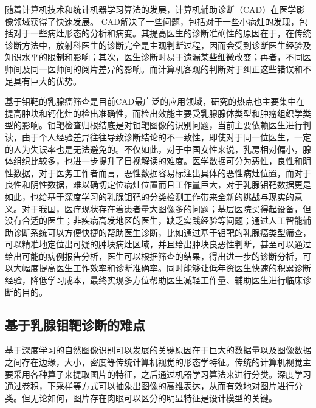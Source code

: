 随着计算机技术和统计机器学习算法的发展，计算机辅助诊断（CAD）\cite{3sathish2016medical}在医学影像领域获得了快速发展。
CAD解决了一些问题，包括对于一些小病灶的发现，包括对于一些病灶形态的分析和病变。其提高医生的诊断准确性的原因在于，在传统诊断方法中，放射科医生的诊断完全是主观判断过程，因而会受到诊断医生经验及知识水平的限制和影响；其次，医生诊断时易于遗漏某些细微改变；再者，不同医师间及同一医师间的阅片差异的影响。而计算机客观的判断对于纠正这些错误和不足具有巨大的优势。

基于钼靶的乳腺癌筛查是目前CAD最广泛的应用领域，研究的热点也主要集中在提高肿块和钙化灶的检出准确性，而检出效能主要受乳腺腺体类型和肿瘤组织学类型的影响。钼靶检查归根结底是对钼靶图像的识别问题，当前主要依赖医生进行判读，由于个人经验差异往往导致诊断结论的不一致性，即使对于同一位医生，一定的人为失误率也是无法避免的。不仅如此，对于中国女性来说，乳房相对偏小，腺体组织比较多，也进一步提升了目视解读的难度。医学数据可分为恶性，良性和阴性数据，对于医务工作者而言，恶性数据容易标注出具体的恶性病灶位置，而对于良性和阴性数据，难以确切定位病灶位置而且工作量巨大，对于乳腺钼靶数据更是如此，也给基于深度学习的乳腺钼靶的分类检测工作带来全新的挑战与现实的意义。对于我国，医疗现状存在着患者量大图像多的问题；基层医院买得起设备，但没有合适的医生；非疾病高发地区的医生，缺乏实践经验等问题；通过人工智能辅助诊断系统可以方便快捷的帮助医生诊断，比如通过基于钼靶的乳腺癌类型筛查，可以精准地定位出可疑的肿块病灶区域，并且给出肿块良恶性判断，甚至可以通过给出可能的病例报告分析，医生可以根据筛查的结果，得出进一步的诊断分析，可以大幅度提高医生工作效率和诊断准确率。同时能够让低年资医生快速的积累诊断经验，降低学习成本，最终实现多方位帮助医生减轻工作量、辅助医生进行临床诊断的目的。

\subsection{基于乳腺钼靶诊断的难点}
基于深度学习的自然图像识别可以发展的关键原因在于巨大的数据量以及图像数据之间存在边缘，大小，密度等传统计算机视觉的形态学特征。传统的计算机视觉主要采用各种算子来提取图片的特征，之后通过机器学习算法来进行分类。深度学习通过卷积，下采样等方式可以抽象出图像的高维表达，从而有效地对图片进行分类。但无论如何，图片存在肉眼可以区分的明显特征是设计模型的关键。

